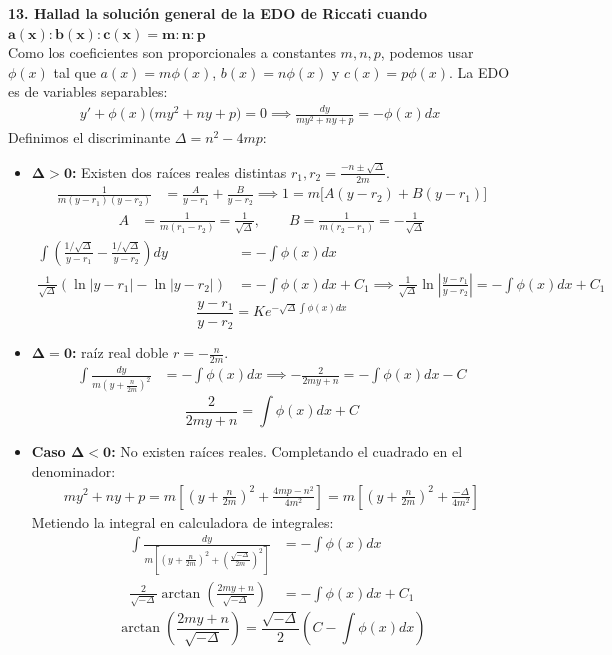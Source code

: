 \documentclass[11pt, a4paper]{article}
\begin{document}
\noindent\textbf{13. Hallad la solución general de la EDO de Riccati cuando $\bm{a(x):b(x):c(x) = m:n:p}$} \\
Como los coeficientes son proporcionales a constantes $m,n,p$, podemos usar $\phi(x)$ tal que $a(x) = m\phi(x)$, $b(x) = n\phi(x)$ y $c(x) = p\phi(x)$. La EDO es de variables separables:
\begin{align*}
y' + \phi(x)\big(my^2 + ny + p\big) = 0 \implies \frac{dy}{my^2 + ny + p} = -\phi(x)dx
\end{align*}
Definimos el discriminante $\Delta = n^2 - 4mp$:
\begin{itemize}
\item \textbf{ $\bm{\Delta > 0}$:} Existen dos raíces reales distintas $r_1, r_2 = \frac{-n \pm \sqrt{\Delta}}{2m}$. \\
\begin{align*}
\frac{1}{m(y-r_1)(y-r_2)} &= \frac{A}{y-r_1} + \frac{B}{y-r_2} \implies 1 = m\big[A(y-r_2) + B(y-r_1)\big]
\end{align*}
\begin{align*}
A &= \frac{1}{m(r_1 - r_2)} = \frac{1}{\sqrt{\Delta}}, \qquad B = \frac{1}{m(r_2 - r_1)} = -\frac{1}{\sqrt{\Delta}}
\end{align*}
\begin{align*}
\int \left( \frac{1/\sqrt{\Delta}}{y-r_1} - \frac{1/\sqrt{\Delta}}{y-r_2} \right) dy &= -\int \phi(x)dx \\
\frac{1}{\sqrt{\Delta}}\left(\ln|y-r_1| - \ln|y-r_2|\right) &= -\int \phi(x)dx + C_1 \implies \frac{1}{\sqrt{\Delta}}\ln\left|\frac{y-r_1}{y-r_2}\right| = -\int \phi(x)dx + C_1
\end{align*}
\[
\boxed{\frac{y-r_1}{y-r_2} = K e^{-\sqrt{\Delta}\int \phi(x)dx}}
\]

\item \textbf{$\bm{\Delta = 0}$:} raíz real doble $r = -\frac{n}{2m}$.
\begin{align*}
\int \frac{dy}{m(y + \frac{n}{2m})^2} &= -\int \phi(x)dx \implies -\frac{2}{2my+n} = -\int \phi(x)dx - C
\end{align*}
\[
\boxed{\frac{2}{2my+n} = \int \phi(x)dx + C}
\]

\item \textbf{Caso $\bm{\Delta < 0}$:} No existen raíces reales. Completando el cuadrado en el denominador:
\begin{align*}
my^2 + ny + p = m\left[\left(y + \frac{n}{2m}\right)^2 + \frac{4mp-n^2}{4m^2}\right] = m\left[\left(y + \frac{n}{2m}\right)^2 + \frac{-\Delta}{4m^2}\right]
\end{align*}
Metiendo la integral en calculadora de integrales:
\begin{align*}
\int \frac{dy}{m\left[\left(y + \frac{n}{2m}\right)^2 + \left(\frac{\sqrt{-\Delta}}{2m}\right)^2\right]} &= -\int \phi(x)dx \\
\frac{2}{\sqrt{-\Delta}}\arctan\left(\frac{2my+n}{\sqrt{-\Delta}}\right) &= -\int \phi(x)dx + C_1
\end{align*}
\[
\boxed{\arctan\left(\frac{2my+n}{\sqrt{-\Delta}}\right) = \frac{\sqrt{-\Delta}}{2}\left(C - \int \phi(x)dx\right)}
\]
\end{itemize}
\end{document}
